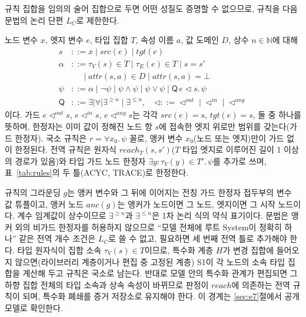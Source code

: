 규칙 집합을 임의의 술어 집합으로 두면 어떤 성질도 증명할 수 없으므로, 규칙을 다음 문법의 논리
단편 $L_C$로 제한한다.

\begin{jokdef}[$L_C$의 문법]\label{def:lc}
노드 변수 $x$, 엣지 변수 $e$, 타입 집합 $T$, 속성 이름 $a$, 값 도메인 $D$, 상수 $n \in \mathbb{N}$에 대해
\begin{align*}
s     &::= x \mid \mathit{src}(e) \mid \mathit{tgt}(e)\\
\alpha&::= \tau_V(s) \in T \mid \tau_E(e) \in T \mid s = s'\\
      &\quad\ \mid \mathit{attr}(s,a) \in D \mid \mathit{attr}(s,a) = \bot\\
\psi  &::= \alpha \mid \neg\psi \mid \psi \wedge \psi \mid \psi \vee \psi \mid \mathsf{Q}\, e \lhd s .\, \psi\\
\mathsf{Q} &::= \exists \mid \forall \mid \exists^{\ge n} \mid \exists^{\le n}, \quad
\lhd ::= \lhd^{\mathit{out}} \mid \lhd^{\mathit{in}} \mid \lhd^{\mathit{any}}
\end{align*}
이다. 가드 $e \lhd^{\mathit{out}} s$, $e \lhd^{\mathit{in}} s$, $e \lhd^{\mathit{any}} s$는 각각
$\mathit{src}(e) = s$, $\mathit{tgt}(e) = s$, 둘 중 하나를 뜻하며, 한정자는 이미 값이 정해진 노드 항 $s$에
접속한 엣지 위로만 범위를 갖는다(가드 한정자). 국소 규칙은 $r = \forall x_0.\,\psi$ 꼴로, 앵커 변수
$x_0$(노드 또는 엣지)만이 가드 없이 한정된다. 전역 규칙은 원자식 $\mathit{reach}_T(s,s')$($T$ 타입
엣지로 이루어진 길이 1 이상의 경로가 있음)와 타입 가드 노드 한정자 $\exists y{:}\tau_V(y) \in T'.\,\psi$를
추가로 쓰며, 표~\ref{tab:rules}의 두 틀(ACYC, TRACE)로 한정한다.
\end{jokdef}

규칙의 그라운딩 $g$는 앵커 변수와 그 뒤에 이어지는 전칭 가드 한정자 접두부의 변수 값 튜플이고,
앵커 노드 $\mathit{anc}(g)$는 앵커가 노드이면 그 노드, 엣지이면 그 시작 노드이다. 계수 임계값이 상수이므로
$\exists^{\ge n}$과 $\exists^{\le n}$은 1차 논리 식의 약식 표기이다. 문법은 앵커 외의 비가드 한정자를
허용하지 않으므로 ``모델 전체에 루트 System이 정확히 하나'' 같은 전역 개수 조건은 $L_C$로 쓸 수 없고,
필요하면 세 번째 전역 틀로 추가해야 한다. 타입 원자식이 집합 소속 $\tau_V(s) \in T$이므로, 특수화
계층 $H$가 변경 집합에 들어오지 않으면(라이브러리 계층이거나 편집 중 고정된 계층) S1이 각 노드의 소속
타입 집합을 계산해 두고 규칙은 국소로 남는다. 반대로 모델 안의 특수화 관계가 편집되면 그 하향 집합 전체의
타입 소속과 상속 속성이 바뀌므로 판정이 $\mathit{reach}$에 의존하는 전역 규칙이 되며, 특수화 폐쇄를 증거
저장소로 유지해야 한다. 이 경계는 \ref{sec:e7}절에서 공개 모델로 확인한다.

